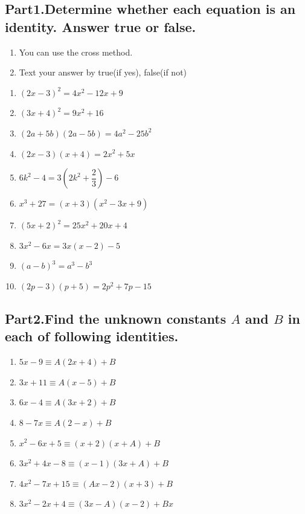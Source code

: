\documentclass[12pt,a4paper,]{article}
\begin{document}
	\subsection*{Part1.Determine whether each equation is an identity. Answer true or false.}
	\begin{enumerate}
		\item You can use the cross method.
		\item Text your answer by true(if yes), false(if not)
	\end{enumerate}
	\begin{enumerate}
		\item $(2x-3)^2 = 4x^2-12x+9$
		\item $(3x+4)^2 = 9x^2+16$
		\item $(2a+5b)(2a-5b)=4a^2-25b^2$
		\item $(2x-3)(x+4)=2x^2+5x$
		\item $6k^2-4 = 3\left(2k^2+\dfrac{2}{3}\right)-6$
		\item $x^3+27=(x+3)(x^2-3x+9)$
		\item $(5x+2)^2=25x^2+20x+4$
		\item $3x^2-6x = 3x(x-2)-5$
		\item $(a-b)^3 = a^3-b^3$
		\item $(2p-3)(p+5)=2p^2+7p-15$
	\end{enumerate}
	\newpage
	\subsection*{Part2.Find the unknown constants $A$ and $B$ in each of following identities.}
	\begin{enumerate}
		\item $5x-9 \equiv A(2x+4)+B$
		\item $3x+11 \equiv A(x-5)+B$
		\item $6x-4 \equiv A(3x+2)+B$
		\item $8-7x \equiv A(2-x)+B$
		\item $x^2-6x+5 \equiv (x+2)(x+A)+B$
		\item $3x^2+4x-8 \equiv (x-1)(3x+A)+B$
		\item $4x^2-7x+15 \equiv (Ax-2)(x+3)+B$
		\item $3x^2-2x+4 \equiv (3x-A)(x-2)+Bx$
	\end{enumerate}
\end{document}
